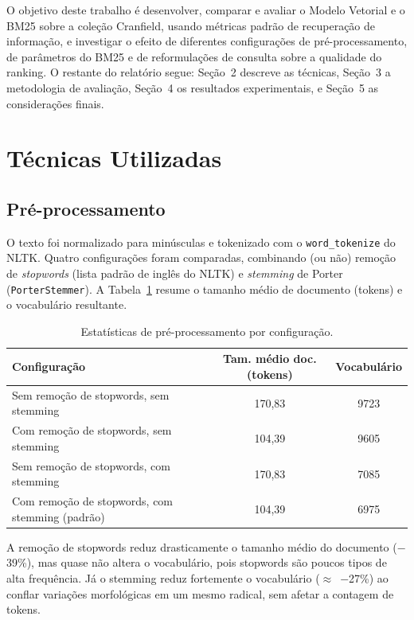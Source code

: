 \documentclass[runningheads]{llncs}
\begin{document}
O objetivo deste trabalho é desenvolver, comparar e avaliar o Modelo Vetorial e o BM25 sobre a coleção Cranfield, usando métricas padrão de recuperação de informação, e investigar o efeito de diferentes configurações de pré-processamento, de parâmetros do BM25 e de reformulações de consulta sobre a qualidade do ranking. O restante do relatório segue: Seção~2 descreve as técnicas, Seção~3 a metodologia de avaliação, Seção~4 os resultados experimentais, e Seção~5 as considerações finais.

\vspace{-1.0em}
\section{Técnicas Utilizadas}

\subsection{Pré-processamento}

O texto foi normalizado para minúsculas e tokenizado com o \texttt{word\_tokenize} do NLTK. Quatro configurações foram comparadas, combinando (ou não) remoção de \emph{stopwords} (lista padrão de inglês do NLTK) e \emph{stemming} de Porter (\texttt{PorterStemmer}). A Tabela~\ref{tab:preproc} resume o tamanho médio de documento (tokens) e o vocabulário resultante.

\begin{table}[t]
\centering
\caption{Estatísticas de pré-processamento por configuração.}
\label{tab:preproc}
\small
\begin{tabular}{lcc}
\toprule
Configuração & Tam. médio doc. (tokens) & Vocabulário \\
\midrule
Sem remoção de stopwords, sem stemming & 170{,}83 & 9723 \\
Com remoção de stopwords, sem stemming & 104{,}39 & 9605 \\
Sem remoção de stopwords, com stemming & 170{,}83 & 7085 \\
Com remoção de stopwords, com stemming (padrão) & 104{,}39 & 6975 \\
\bottomrule
\end{tabular}
\end{table}

A remoção de stopwords reduz drasticamente o tamanho médio do documento ($-$39\%), mas quase não altera o vocabulário, pois stopwords são poucos tipos de alta frequência. Já o stemming reduz fortemente o vocabulário ($\approx$~$-$27\%) ao conflar variações morfológicas em um mesmo radical, sem afetar a contagem de tokens.
\end{document}

